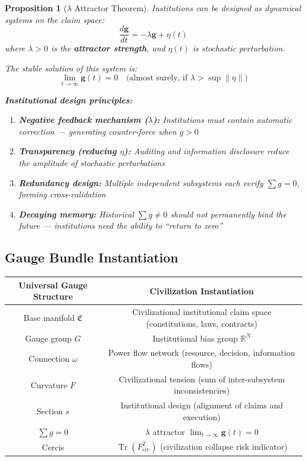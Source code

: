 \documentclass[12pt,a4paper]{article}
\theoremstyle{plain}
\newtheorem{proposition}[theorem]{Proposition}
\theoremstyle{definition}
\newcommand{\R}{\mathbb{R}}
\newcommand{\gv}{\mathbf{g}}
\newcommand{\curv}{F}
\newcommand{\conn}{\omega}
\newcommand{\ClaimSpace}{\mathfrak{C}}
\DeclareMathOperator{\Tr}{Tr}
\begin{document}
\begin{proposition}[$\lambda$ Attractor Theorem]
Institutions can be designed as dynamical systems on the claim space:
\begin{equation}
    \frac{d\gv}{dt} = -\lambda \gv + \eta(t)
\end{equation}
where $\lambda > 0$ is the \textbf{attractor strength}, and $\eta(t)$ is stochastic perturbation.

The stable solution of this system is:
\begin{equation}
    \lim_{t \to \infty} \gv(t) = 0 \quad \text{(almost surely, if $\lambda > \sup \|\eta\|$)}
\end{equation}

\textbf{Institutional design principles:}
\begin{enumerate}[label=(\alph*)]
    \item \textbf{Negative feedback mechanism ($\lambda$):} Institutions must contain automatic correction — generating counter-force when $g > 0$
    \item \textbf{Transparency (reducing $\eta$):} Auditing and information disclosure reduce the amplitude of stochastic perturbations
    \item \textbf{Redundancy design:} Multiple independent subsystems each verify $\sum g = 0$, forming cross-validation
    \item \textbf{Decaying memory:} Historical $\sum g \neq 0$ should not permanently bind the future — institutions need the ability to ``return to zero''
\end{enumerate}
\end{proposition}

\subsection{Gauge Bundle Instantiation}

\begin{center}
\begin{tabular}{c|c}
    \toprule
    \textbf{Universal Gauge Structure} & \textbf{Civilization Instantiation} \\
    \midrule
    Base manifold $\ClaimSpace$ & Civilizational institutional claim space (constitutions, laws, contracts) \\
    Gauge group $G$ & Institutional bias group $\R^N$ \\
    Connection $\conn$ & Power flow network (resource, decision, information flows) \\
    Curvature $\curv$ & Civilizational tension (sum of inter-subsystem inconsistencies) \\
    Section $s$ & Institutional design (alignment of claims and execution) \\
    $\sum g = 0$ & $\lambda$ attractor $\lim_{t \to \infty} \gv(t) = 0$ \\
    Cercis & $\Tr(F_{\text{civ}}^2)$ (civilization collapse risk indicator) \\
    \bottomrule
\end{tabular}
\end{center}
\end{document}
